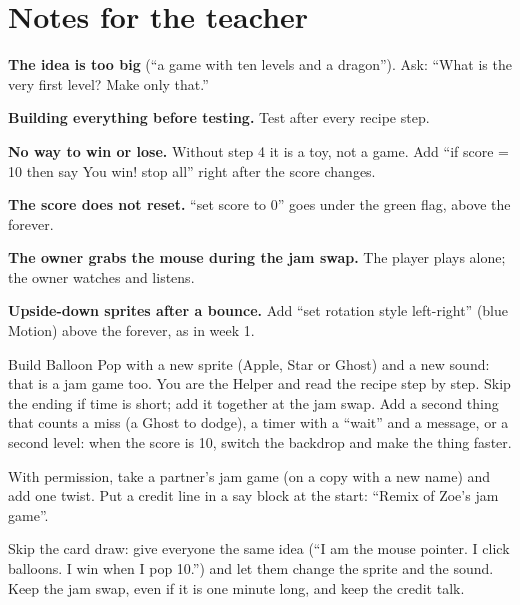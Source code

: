 \section{Notes for the teacher}
\begin{commonmistakes}
  \item \textbf{The idea is too big} (\enquote{a game with ten levels and a dragon}). Ask: \enquote{What is the very first level? Make only that.}
  \item \textbf{Building everything before testing.} Test after every recipe step.
  \item \textbf{No way to win or lose.} Without step 4 it is a toy, not a game. Add \enquote{if score = 10 then say You win! stop all} right after the score changes.
  \item \textbf{The score does not reset.} \enquote{set score to 0} goes under the green flag, above the forever.
  \item \textbf{The owner grabs the mouse during the jam swap.} The player plays alone; the owner watches and listens.
  \item \textbf{Upside-down sprites after a bounce.} Add \enquote{set rotation style left-right} (blue Motion) above the forever, as in week 1.
\end{commonmistakes}

\begin{differentiation}
\supportpath Build Balloon Pop with a new sprite (Apple, Star or Ghost) and a new sound: that is a jam game too. You are the Helper and read the recipe step by step. Skip the ending if time is short; add it together at the jam swap.
\extensionpath Add a second thing that counts a miss (a Ghost to dodge), a timer with a \enquote{wait} and a message, or a second level: when the score is 10, switch the backdrop and make the thing faster.
\end{differentiation}

\begin{stretchchallenge}
With permission, take a partner's jam game (on a copy with a new name) and add one twist. Put a credit line in a say block at the start: \enquote{Remix of Zoe's jam game}.
\end{stretchchallenge}

\begin{teachernote}
Skip the card draw: give everyone the same idea (\enquote{I am the mouse pointer. I click balloons. I win when I pop 10.}) and let them change the sprite and the sound. Keep the jam swap, even if it is one minute long, and keep the credit talk.
\end{teachernote}
